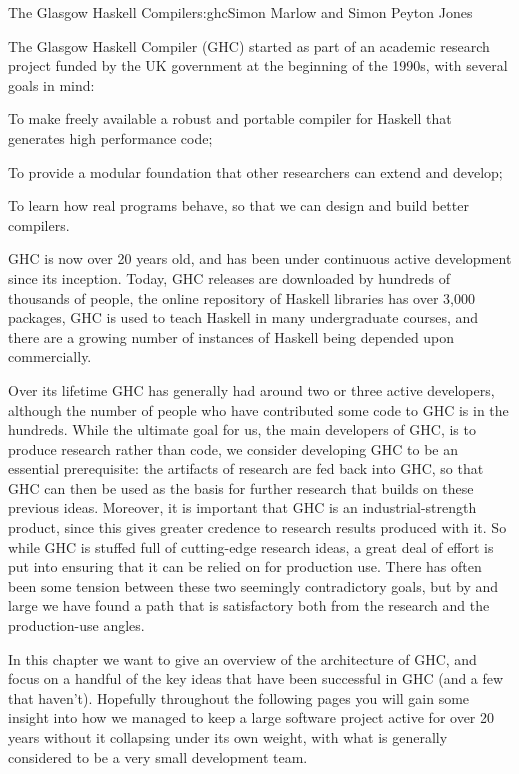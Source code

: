 \begin{aosachapter}{The Glasgow Haskell Compiler}{s:ghc}{Simon Marlow and Simon Peyton Jones}

The Glasgow Haskell Compiler (GHC) started as part of an academic
research project funded by the UK government at the beginning of the
1990s, with several goals in mind:

\begin{aosaitemize}

\item To make freely available a robust and portable compiler for
  Haskell that generates high performance code;

\item To provide a modular foundation that other researchers can
  extend and develop;

\item To learn how real programs behave, so that we can design and
  build better compilers.

\end{aosaitemize}

GHC is now over 20 years old, and has been under continuous active
development since its inception.  Today, GHC releases are downloaded
by hundreds of thousands of people, the online repository of Haskell
libraries has over 3,000 packages, GHC is used to teach Haskell in many
undergraduate courses, and there are a growing number of instances of
Haskell being depended upon commercially.

Over its lifetime GHC has generally had around two or three active
developers, although the number of people who have contributed some
code to GHC is in the hundreds.  While the ultimate goal for us, the
main developers of GHC, is to produce research rather than code, we
consider developing GHC to be an essential prerequisite: the artifacts
of research are fed back into GHC, so that GHC can then be used as the
basis for further research that builds on these previous ideas.
Moreover, it is important that GHC is an industrial-strength product,
since this gives greater credence to research results produced with
it.  So while GHC is stuffed full of cutting-edge research ideas, a
great deal of effort is put into ensuring that it can be relied on for
production use.  There has often been some tension between these two
seemingly contradictory goals, but by and large we have found a path
that is satisfactory both from the research and the production-use
angles.

In this chapter we want to give an overview of the architecture of
GHC, and focus on a handful of the key ideas that have been successful
in GHC (and a few that haven't).  Hopefully throughout the following
pages you will gain some insight into how we managed to keep a large
software project active for over 20 years without it collapsing under
its own weight, with what is generally considered to be a very small
development team.


\end{aosachapter}
